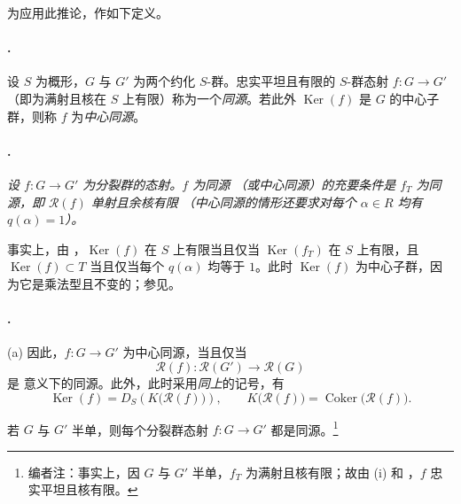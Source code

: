 为应用此推论，作如下定义。

\paragraph{.}
设 \(S\) 为概形，\(G\) 与 \(G'\) 为两个约化 \(S\)-群。忠实平坦且有限的 \(S\)-群态射 \(f:G\to G'\) \textup{（即为满射且核在 \(S\) 上有限）}称为一个\emph{同源}。若此外 \(\operatorname{Ker}(f)\) 是 \(G\) 的中心子群，则称 \(f\) 为\emph{中心同源}。

\paragraph{.}
\textit{设 \(f:G\to G'\) 为分裂群的态射。\(f\) 为同源 \textup{（或中心同源）}的充要条件是 \(f_T\) 为同源，即 \(\mathscr R(f)\) 单射且余核有限 \textup{（中心同源的情形还要求对每个 \(\alpha\in R\) 均有 \(q(\alpha)=1\)）}。}

事实上，由 ，\(\operatorname{Ker}(f)\) 在 \(S\) 上有限当且仅当 \(\operatorname{Ker}(f_T)\) 在 \(S\) 上有限，且 \(\operatorname{Ker}(f)\subset T\) 当且仅当每个 \(q(\alpha)\) 均等于 \(1\)。此时 \(\operatorname{Ker}(f)\) 为中心子群，因为它是乘法型且不变的；参见。

\paragraph{.}
\textup{(a)} 因此，\(f:G\to G'\) 为中心同源，当且仅当
\[
  \mathscr R(f):\mathscr R(G')\longrightarrow\mathscr R(G)
\]
是 意义下的同源。此外，此时采用\emph{同上}的记号，有
\[
  \operatorname{Ker}(f)
  =
  D_S\!\left(K\bigl(\mathscr R(f)\bigr)\right),
  \qquad
  K\bigl(\mathscr R(f)\bigr)
  =
  \operatorname{Coker}\bigl(\mathscr R(f)\bigr).
\]

\textup{} 若 \(G\) 与 \(G'\) 半单，则每个分裂群态射 \(f:G\to G'\) 都是同源。\footnote{编者注：事实上，因 \(G\) 与 \(G'\) 半单，\(f_T\) 为满射且核有限；故由 \textup{(i)} 和 ，\(f\) 忠实平坦且核有限。}

